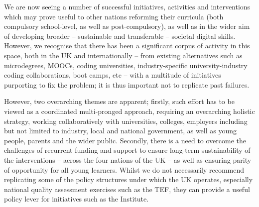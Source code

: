 \documentclass[conference]{IEEEtran}
\begin{document}
We are now seeing a number of successful initiatives, activities and
interventions which may prove useful to other nations reforming their
curricula (both compulsory school-level, as well as post-compulsory),
as well as in the wider aim of developing broader -- sustainable and
transferable -- societal digital skills. However, we recognise that
there has been a significant corpus of activity in this space, both in
the UK and internationally -- from existing alternatives such as
microdegrees, MOOCs, coding universities, industry-specific
university-industry coding collaborations, boot camps, etc -- with a
multitude of initiatives purporting to fix the problem; it is thus
important not to replicate past failures.



However, two overarching themes are apparent; firstly, such effort has
to be viewed as a coordinated multi-pronged approach, requiring an
overarching holistic strategy, working collaboratively with
universities, colleges, employers including but not limited to
industry, local and national government, as well as young people,
parents and the wider public. Secondly, there is a need to overcome
the challenges of recurrent funding and support to ensure long-term
sustainability of the interventions -- across the four nations of the
UK -- as well as ensuring parity of opportunity for all young
learners. Whilst we do not necessarily recommend replicating some of
the policy structures under which the UK operates, especially national
quality assessment exercises such as the TEF, they can provide a
useful policy lever for initiatives such as the Institute.
\end{document}
